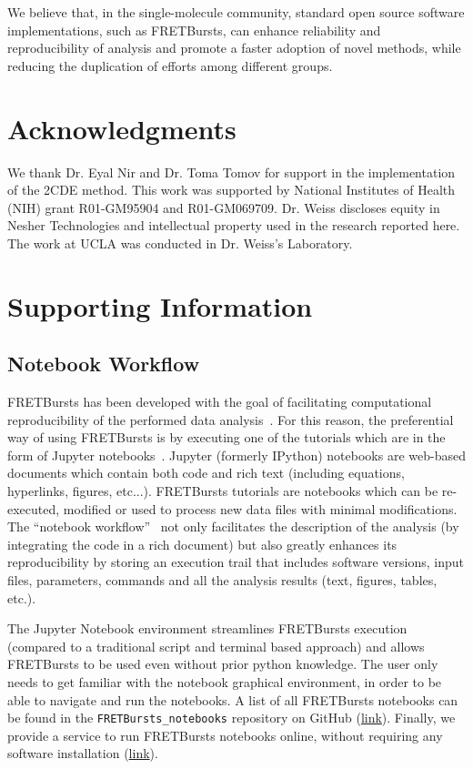 \documentclass[10pt,letterpaper]{article}
\begin{document}
We believe that, in the single-molecule community,
standard open source software implementations, such as FRETBursts, can enhance
reliability and reproducibility of analysis and promote a faster adoption of novel methods,
while reducing the duplication of efforts among different groups.

\section*{Acknowledgments}
We thank Dr. Eyal Nir and Dr. Toma Tomov for support in the implementation of the 2CDE method.
This work was supported by National Institutes of Health (NIH)
grant R01-GM95904 and R01-GM069709. Dr. Weiss discloses equity in
Nesher Technologies and intellectual property used in the research
reported here. The work at UCLA was conducted in Dr. Weiss's Laboratory. 


\section{Supporting Information}

\subsection{Notebook Workflow}
\label{sec:notebook}

FRETBursts has been developed with the goal of facilitating computational reproducibility
of the performed data analysis~\cite{Buckheit_1995}. For this reason,
the preferential way of using FRETBursts is by executing one of the tutorials
which are in the form of Jupyter notebooks~\cite{Shen_2014}.
Jupyter (formerly IPython) notebooks are web-based documents which contain both
code and rich text (including equations, hyperlinks, figures, etc...).
FRETBursts tutorials are notebooks which can be re-executed,
modified or used to process new data files with minimal modifications.
The ``notebook workflow''~\cite{Shen_2014} not only facilitates
the description of the analysis (by integrating the code in a rich document)
but also greatly enhances its reproducibility by storing an execution trail
that includes software versions, input files, parameters, commands and all
the analysis results (text, figures, tables, etc.).

The Jupyter Notebook environment streamlines FRETBursts execution (compared to
a traditional script and terminal based approach) and allows
FRETBursts to be used even without prior python knowledge.
The user only needs to get familiar with the
notebook graphical environment, in order to be able to navigate and run the notebooks.
A list of all FRETBursts notebooks can be found in the
\verb|FRETBursts_notebooks| repository on GitHub
(\href{https://github.com/tritemio/FRETBursts_notebooks}{link}).
Finally, we provide a service to run FRETBursts notebooks online,
without requiring any software installation 
(\href{https://github.com/tritemio/FRETBursts_notebooks#run-online}{link}).
\end{document}
